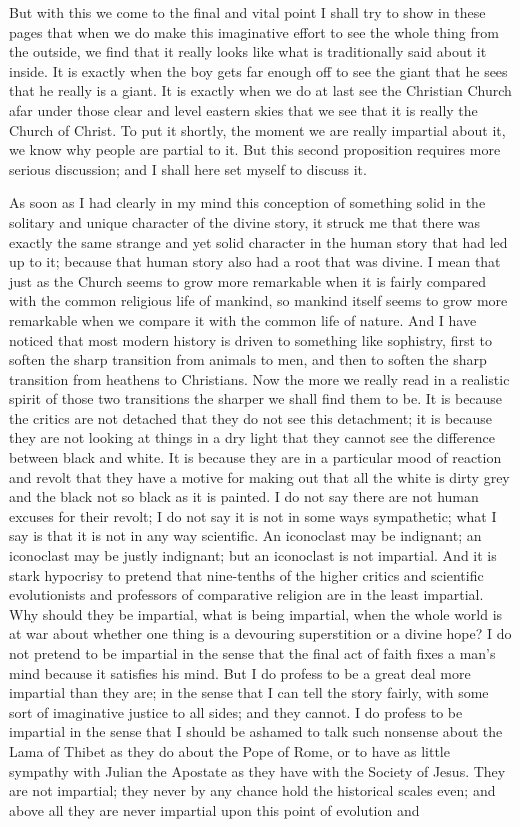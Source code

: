 But with this we come to the final and vital point I shall try to show in these pages that when we do make this imaginative effort to see the whole thing from the outside, we find that it really looks like what is traditionally said about it inside. It is exactly when the boy gets far enough off to see the giant that he sees that he really is a giant. It is exactly when we do at last see the Christian Church afar under those clear and level eastern skies that we see that it is really the Church of Christ. To put it shortly, the moment we are really impartial about it, we know why people are partial to it. But this second proposition requires more serious discussion; and I shall here set myself to discuss it.

As soon as I had clearly in my mind this conception of something solid in the solitary and unique character of the divine story, it struck me that there was exactly the same strange and yet solid character in the human story that had led up to it; because that human story also had a root that was divine. I mean that just as the Church seems to grow more remarkable when it is fairly compared with the common religious life of mankind, so mankind itself seems to grow more remarkable when we compare it with the common life of nature. And I have noticed that most modern history is driven to something like sophistry, first to soften the sharp transition from animals to men, and then to soften the sharp transition from heathens to Christians. Now the more we really read in a realistic spirit of those two transitions the sharper we shall find them to be. It is because the critics are not detached that they do not see this detachment; it is because they are not looking at things in a dry light that they cannot see the difference between black and white. It is because they are in a particular mood of reaction and revolt that they have a motive for making out that all the white is dirty grey and the black not so black as it is painted. I do not say there are not human excuses for their revolt; I do not say it is not in some ways sympathetic; what I say is that it is not in any way scientific. An iconoclast may be indignant; an iconoclast may be justly indignant; but an iconoclast is not impartial. And it is stark hypocrisy to pretend that nine-tenths of the higher critics and scientific evolutionists and professors of comparative religion are in the least impartial. Why should they be impartial, what is being impartial, when the whole world is at war about whether one thing is a devouring superstition or a divine hope? I do not pretend to be impartial in the sense that the final act of faith fixes a man's mind because it satisfies his mind. But I do profess to be a great deal more impartial than they are; in the sense that I can tell the story fairly, with some sort of imaginative justice to all sides; and they cannot. I do profess to be impartial in the sense that I should be ashamed to talk such nonsense about the Lama of Thibet as they do about the Pope of Rome, or to have as little sympathy with Julian the Apostate as they have with the Society of Jesus. They are not impartial; they never by any chance hold the historical scales even; and above all they are never impartial upon this point of evolution and 